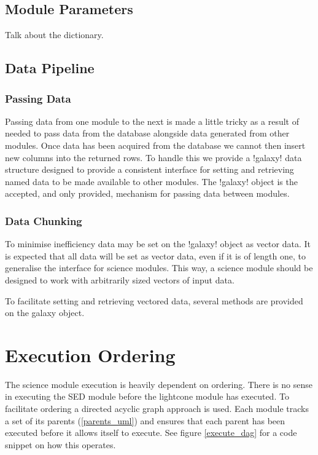 \documentclass[14pt]{article}
\begin{document}
\subsection{Module Parameters}

Talk about the dictionary.

\subsection{Data Pipeline}

\subsubsection{Passing Data}

Passing data from one module to the next is made a little tricky as
a result of needed to pass data from the database alongside data
generated from other modules. Once data has been acquired from the
database we cannot then insert new columns into the returned rows.
To handle this we provide a \lstverb!galaxy! data structure designed
to provide a consistent interface for setting and retrieving named
data to be made available to other modules. The \lstverb!galaxy!
object is the accepted, and only provided, mechanism for passing
data between modules.

\subsubsection{Data Chunking}

To minimise inefficiency data may be set on the \lstverb!galaxy!
object as vector data. It is expected that all data will be set
as vector data, even if it is of length one, to generalise the
interface for science modules. This way, a science module should
be designed to work with arbitrarily sized vectors of input
data.

To facilitate setting and retrieving vectored data, several methods
are provided on the galaxy object.

\section{Execution Ordering}

The science module execution is heavily dependent on ordering. There is no
sense in executing the SED module before the lightcone module has
executed. To facilitate ordering a directed acyclic graph approach is used.
Each module tracks a set of its parents (\ref{parents_uml}) and ensures that
each parent has been executed before it allows itself to execute. See
figure \ref{execute_dag} for a code snippet on how this operates.
\end{document}
